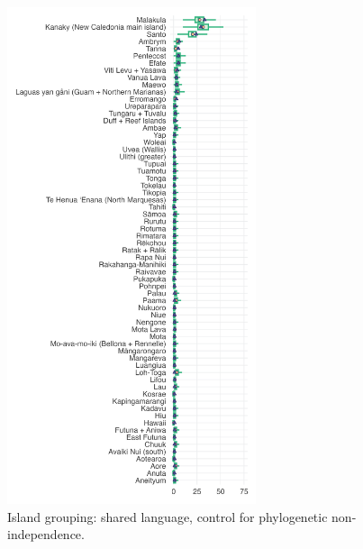 \documentclass[unnumsec,webpdf,modern,medium]{oup-authoring-template}
\begin{document}
\begin{figure}[ht]
\includegraphics[width=0.65\textwidth]{brms_predict_medium_control_phylo.png}
\caption{Island grouping: shared language,  control for phylogenetic non-independence.}
\label{brms_predict_medium_control_phylo.png}
\end{figure}
\end{document}

